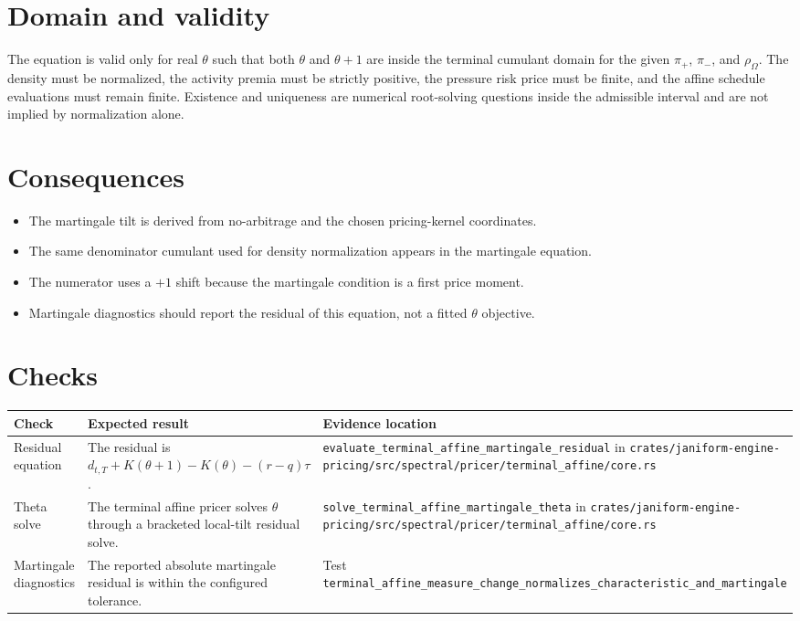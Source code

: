 \documentclass[11pt]{article}
\begin{document}
\section{Domain and validity}

The equation is valid only for real \(\theta\) such that both
\(\theta\) and \(\theta+1\) are inside the terminal cumulant domain for the
given \(\pi_+\), \(\pi_-\), and \(\rho_\Omega\).
The density must be normalized, the activity premia must be strictly positive,
the pressure risk price must be finite,
and the affine schedule evaluations must remain finite.
Existence and uniqueness are numerical root-solving questions
inside the admissible interval and are not implied by normalization alone.

\section{Consequences}

\begin{itemize}
    \item The martingale tilt is derived from no-arbitrage and the chosen pricing-kernel coordinates.
    \item The same denominator cumulant used for density normalization appears in the martingale equation.
    \item The numerator uses a \(+1\) shift because the martingale condition is a first price moment.
    \item Martingale diagnostics should report the residual of this equation, not a fitted \(\theta\) objective.
\end{itemize}

\section{Checks}

\begin{tabularx}{\textwidth}{XXX}
\toprule
Check & Expected result & Evidence location\\
\midrule
Residual equation
& The residual is \(d_{t,T}+K(\theta+1)-K(\theta)-(r-q)\tau\).
& \texttt{evaluate\_terminal\_affine\_martingale\_residual} in \texttt{crates/janiform-engine-pricing/src/spectral/pricer/terminal\_affine/core.rs}\\
Theta solve
& The terminal affine pricer solves \(\theta\) through a bracketed local-tilt residual solve.
& \texttt{solve\_terminal\_affine\_martingale\_theta} in \texttt{crates/janiform-engine-pricing/src/spectral/pricer/terminal\_affine/core.rs}\\
Martingale diagnostics
& The reported absolute martingale residual is within the configured tolerance.
& Test \texttt{terminal\_affine\_measure\_change\_normalizes\_characteristic\_and\_martingale}\\
\bottomrule
\end{tabularx}
\end{document}
